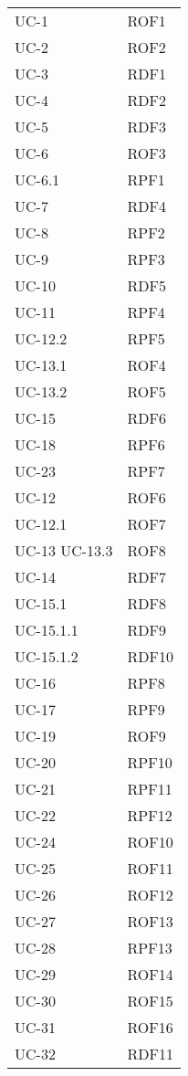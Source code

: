 \begin{longtable}{| p{5cm} | p{5cm} |}
		UC-1 & ROF1 \\
		\rowcolor{LightGray}
		UC-2 & ROF2 \\
		UC-3 & RDF1 \\
		\rowcolor{LightGray}
		UC-4 & RDF2 \\
		UC-5 & RDF3 \\
		\rowcolor{LightGray}
		UC-6 & ROF3 \\
		UC-6.1 & RPF1 \\
		\rowcolor{LightGray}
		UC-7 & RDF4 \\
		UC-8 & RPF2 \\
		\rowcolor{LightGray}
		UC-9 & RPF3 \\
		UC-10 & RDF5 \\
		\rowcolor{LightGray}
		UC-11 & RPF4 \\
		UC-12.2 & RPF5 \\
		\rowcolor{LightGray}
		UC-13.1 & ROF4 \\
		UC-13.2 & ROF5 \\
		\rowcolor{LightGray}
		UC-15 & RDF6 \\
		UC-18 & RPF6 \\
		\rowcolor{LightGray}
		UC-23 & RPF7 \\
		UC-12 & ROF6 \\
		\rowcolor{LightGray}
		UC-12.1 &ROF7 \\
		UC-13 \newline UC-13.3 & ROF8 \\
		\rowcolor{LightGray}
		UC-14 & RDF7 \\
		UC-15.1 & RDF8 \\
		\rowcolor{LightGray}
		UC-15.1.1 & RDF9 \\
		UC-15.1.2 & RDF10\\
		\rowcolor{LightGray}
		UC-16 & RPF8 \\
		UC-17 & RPF9 \\
		\rowcolor{LightGray}
		UC-19 & ROF9 \\
		UC-20 & RPF10 \\
		\rowcolor{LightGray}
		UC-21 & RPF11 \\
		UC-22 & RPF12 \\ 
		\rowcolor{LightGray}
		UC-24 & ROF10 \\
		UC-25 & ROF11 \\
		\rowcolor{LightGray}
		UC-26 & ROF12 \\
		UC-27 & ROF13 \\
		\rowcolor{LightGray}
		UC-28 & RPF13 \\
		UC-29 & ROF14 \\
		\rowcolor{LightGray}
		UC-30 & ROF15 \\
		UC-31 & ROF16 \\
		\rowcolor{LightGray}
		UC-32 & RDF11 \\
		\hline
\end{longtable}

